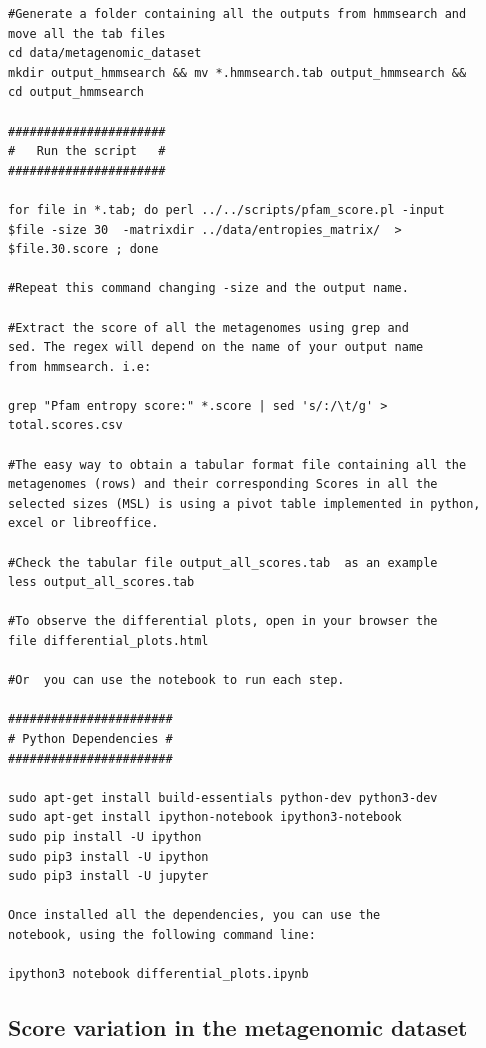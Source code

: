 \documentclass[12pt]{report}
\begin{document}
\begin{verbatim}
#Generate a folder containing all the outputs from hmmsearch and 
move all the tab files  
cd data/metagenomic_dataset
mkdir output_hmmsearch && mv *.hmmsearch.tab output_hmmsearch && 
cd output_hmmsearch 

######################
#   Run the script   #
######################

for file in *.tab; do perl ../../scripts/pfam_score.pl -input 
$file -size 30  -matrixdir ../data/entropies_matrix/  > 
$file.30.score ; done 

#Repeat this command changing -size and the output name. 

#Extract the score of all the metagenomes using grep and 
sed. The regex will depend on the name of your output name 
from hmmsearch. i.e:

grep "Pfam entropy score:" *.score | sed 's/:/\t/g' > 
total.scores.csv 

#The easy way to obtain a tabular format file containing all the 
metagenomes (rows) and their corresponding Scores in all the 
selected sizes (MSL) is using a pivot table implemented in python, excel or libreoffice.

#Check the tabular file output_all_scores.tab  as an example 
less output_all_scores.tab

#To observe the differential plots, open in your browser the 
file differential_plots.html

#Or  you can use the notebook to run each step.

#######################
# Python Dependencies #
#######################

sudo apt-get install build-essentials python-dev python3-dev
sudo apt-get install ipython-notebook ipython3-notebook
sudo pip install -U ipython
sudo pip3 install -U ipython
sudo pip3 install -U jupyter

Once installed all the dependencies, you can use the 
notebook, using the following command line:

ipython3 notebook differential_plots.ipynb

\end{verbatim}
\subsection{Score variation in the metagenomic dataset }
\end{document}
